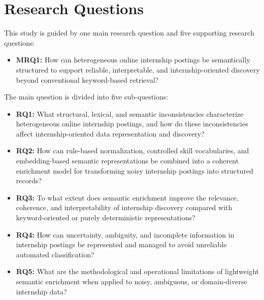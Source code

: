 \section{Research Questions}
This study is guided by one main research question and five supporting research questions:

\begin{itemize}[leftmargin=1.4em,itemsep=0.25em,topsep=0.25em]
\item \textbf{MRQ1:}  How can heterogeneous online internship postings be semantically structured to support
reliable, interpretable, and internship-oriented discovery beyond conventional keyword-based
retrieval?
\end{itemize}

The main question is divided into five sub-questions:
\begin{itemize}[leftmargin=1.4em,itemsep=0.25em,topsep=0.25em]
\item \textbf{RQ1:} What structural, lexical, and semantic inconsistencies characterize heterogeneous online
internship postings, and how do these inconsistencies affect internship-oriented data
representation and discovery?
\item \textbf{RQ2:} How can rule-based normalization, controlled skill vocabularies, and embedding-based
semantic representations be combined into a coherent enrichment model for transforming noisy
internship postings into structured records?
\item \textbf{RQ3:} To what extent does semantic enrichment improve the relevance, coherence, and
interpretability of internship discovery compared with keyword-oriented or purely deterministic
representations?
\item \textbf{RQ4:} How can uncertainty, ambiguity, and incomplete information in internship postings be
represented and managed to avoid unreliable automated classification?
\item \textbf{RQ5:} What are the methodological and operational limitations of lightweight semantic
enrichment when applied to noisy, ambiguous, or domain-diverse internship data?
\end{itemize}


